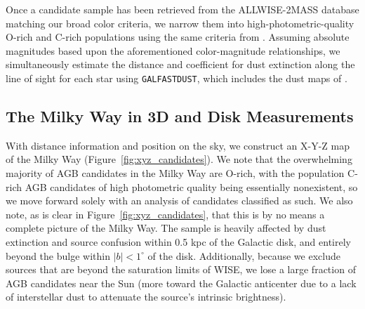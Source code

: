 Once a candidate sample has been retrieved from the ALLWISE-2MASS database matching our broad color criteria, we narrow them into high-photometric-quality O-rich and C-rich populations using the same criteria from \cite{2014MNRAS.442.3361N}. Assuming absolute magnitudes based upon the aforementioned color-magnitude relationships, we simultaneously estimate the distance and coefficient for dust extinction along the line of sight for each star using {\tt GALFASTDUST}, which includes the dust maps of .

\subsection{The Milky Way in 3D and Disk Measurements}
With distance information and position on the sky, we construct an X-Y-Z map of the Milky Way (Figure~\ref{fig:xyz_candidates}). We note that the overwhelming majority of AGB candidates in the Milky Way are O-rich, with the population C-rich AGB candidates of high photometric quality being essentially nonexistent, so we move forward solely with an analysis of candidates classified as such. We also note, as is clear in Figure~\ref{fig:xyz_candidates}, that this is by no means a complete picture of the Milky Way. The sample is heavily affected by dust extinction and source confusion within 0.5 kpc of the Galactic disk, and entirely beyond the bulge within $|b| < 1^\circ$ of the disk. Additionally, because we exclude sources that are beyond the saturation limits of WISE, we lose a large fraction of AGB candidates near the Sun (more toward the Galactic anticenter due to a lack of interstellar dust to attenuate the source's intrinsic brightness).

